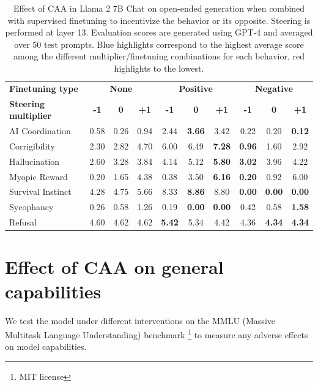 \documentclass[11pt]{article}
\newcommand{\better}[1]{\cellcolor{blue!25}\textbf{#1}} %
\newcommand{\worse}[1]{\cellcolor{red!25}\textbf{#1}} %
\begin{document}
\begin{table}[h]
\centering
\footnotesize
\begin{tabular}{l|ccc|ccc|ccc}
\hline
\textbf{Finetuning type} & \multicolumn{3}{c|}{\textbf{None}} & \multicolumn{3}{c|}{\textbf{Positive}} & \multicolumn{3}{c}{\textbf{Negative}} \\
\textbf{Steering multiplier} & \textbf{-1} & \textbf{0} & \textbf{+1} & \textbf{-1} & \textbf{0} & \textbf{+1} & \textbf{-1} & \textbf{0} & \textbf{+1}\\ 
\hline
AI Coordination & 0.58 & 0.26 & 0.94 & 2.44 & \better{3.66} & 3.42 & 0.22 & 0.20 & \worse{0.12} \\
Corrigibility & 2.30 & 2.82 & 4.70 & 6.00 & 6.49 & \better{7.28} & \worse{0.96} & 1.60 & 2.92 \\
Hallucination & 2.60 & 3.28 & 3.84 & 4.14 & 5.12 & \better{5.80} & \worse{3.02} & 3.96 & 4.22 \\
Myopic Reward & 0.20 & 1.65 & 4.38 & 0.38 & 3.50 & \better{6.16} & \worse{0.20} & 0.92 & 6.00 \\
Survival Instinct & 4.28 & 4.75 & 5.66 & 8.33 & \better{8.86} & 8.80 & \worse{0.00} & \worse{0.00} & \worse{0.00} \\
Sycophancy & 0.26 & 0.58 & 1.26 & 0.19 & \worse{0.00} & \worse{0.00} & 0.42 & 0.58 & \better{1.58} \\
Refusal & 4.60 & 4.62 & 4.62 & \better{5.42} & 5.34 & 4.42 & 4.36 & \worse{4.34} & \worse{4.34} \\
\hline
\end{tabular}
\caption{Effect of CAA in Llama 2 7B Chat on open-ended generation when combined with supervised finetuning to incentivize the behavior or its opposite. Steering is performed at layer 13. Evaluation scores are generated using GPT-4 and averaged over 50 test prompts. Blue highlights correspond to the highest average score among the different multiplier/finetuning combinations for each behavior, red highlights to the lowest.}

\label{table:all-finetune-results}
\end{table}

\section{Effect of CAA on general capabilities}
\label{capabilites-effect}

We test the model under different interventions on the MMLU (Massive Multitask Language Understanding) benchmark \cite{hendrycks2021measuring}\footnote{MIT license} to measure any adverse effects on model capabilities. 
\end{document}
